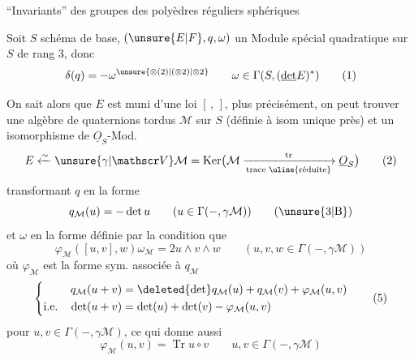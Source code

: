 
``Invariants'' des groupes des polyèdres réguliers sphériques

 Soit $S$ schéma de base, $(\unsure{E|F},q,\omega)$ un Module spécial quadratique sur $S$ de rang $3$, donc
\[
\delta(q)=-\omega^{\unsure{\otimes(2)|(\otimes2)|\otimes2}}\qquad\omega\in\Gamma(S,(\underline{\det}E)^*)\tag*{(1)}
\]

On sait alors que $E$ est muni d'une loi $[\, ,\, ]$, plus précisément, on peut trouver une algèbre de quaternions tordus $\mathcal M$ sur $S$ (définie à isom unique près) et un isomorphisme de $\underline O_S$-Mod.
\[
E\xleftarrow{\sim}\unsure{\gamma|\mathscr V}\mathcal M=\operatorname{Ker}\bigl(\mathcal M\xrightarrow[\text{trace \uline{réduite}}]{\mathrm{tr}}\underline O_S\bigr)\tag*{(2)}
\]
transformant $q$ en la forme
\[
q_{\mathcal M}(u)=-\det u\qquad(u\in\Gamma(-,\gamma\mathcal M))\tag*{(\unsure{3|B})}
\]
et $\omega$ en la forme  définie par la condition que
\[
\varphi_{\mathcal M}([u,v],w)\omega_{\mathcal M}=2u\wedge v\wedge w\qquad(u,v,w\in\Gamma(-,\gamma\mathcal M))\tag*{(4)}
\]
où $\varphi_{\mathcal M}$ est la forme   sym. associée à $q_{\mathcal M}$
\[
\left\{\begin{aligned}q_{\mathcal M}(u+v)&=\deleted{\det}q_{\mathcal M}(u)+q_{\mathcal M}(v)+\varphi_{\mathcal M}(u,v)\\ \text{i.e.}\quad\det(u+v)&=\det(u)+\det(v)-\varphi_{\mathcal M}(u,v)\end{aligned}\right.\tag*{(5)}
\]
pour $u,v\in\Gamma(-,\gamma\mathcal M)$, ce qui donne aussi
\[
\varphi_{\mathcal M}(u,v)=\operatorname{Tr}u\circ v\qquad u,v\in\Gamma(-,\gamma\mathcal M)\tag*{(6)}
\]
